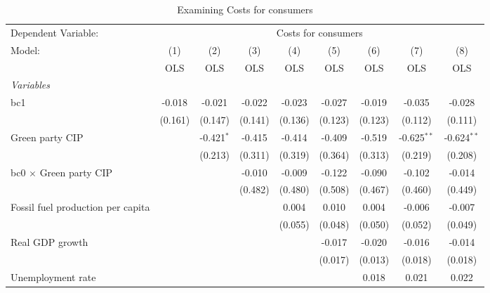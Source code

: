 
\begin{table}[htbp]
   \caption{Examining Costs for consumers}
   \centering
   \begin{tabular}{lcccccccc}
      \toprule
      Dependent Variable: & \multicolumn{8}{c}{Costs for consumers}\\
      Model:                                  & (1)     & (2)          & (3)     & (4)     & (5)     & (6)     & (7)           & (8)\\  
                                              &  OLS    & OLS          & OLS     & OLS     & OLS     & OLS     & OLS           & OLS\\  
      \midrule
      \emph{Variables}\\
      bc1                                     & -0.018  & -0.021       & -0.022  & -0.023  & -0.027  & -0.019  & -0.035        & -0.028\\   
                                              & (0.161) & (0.147)      & (0.141) & (0.136) & (0.123) & (0.123) & (0.112)       & (0.111)\\   
      Green party CIP                         &         & -0.421$^{*}$ & -0.415  & -0.414  & -0.409  & -0.519  & -0.625$^{**}$ & -0.624$^{**}$\\   
                                              &         & (0.213)      & (0.311) & (0.319) & (0.364) & (0.313) & (0.219)       & (0.208)\\   
      bc0 $\times$ Green party CIP            &         &              & -0.010  & -0.009  & -0.122  & -0.090  & -0.102        & -0.014\\   
                                              &         &              & (0.482) & (0.480) & (0.508) & (0.467) & (0.460)       & (0.449)\\   
      Fossil fuel production per capita       &         &              &         & 0.004   & 0.010   & 0.004   & -0.006        & -0.007\\   
                                              &         &              &         & (0.055) & (0.048) & (0.050) & (0.052)       & (0.049)\\   
      Real GDP growth                         &         &              &         &         & -0.017  & -0.020  & -0.016        & -0.014\\   
                                              &         &              &         &         & (0.017) & (0.013) & (0.018)       & (0.018)\\   
      Unemployment rate                       &         &              &         &         &         & 0.018   & 0.021         & 0.022\\   

\end{tabular}
\end{table}
